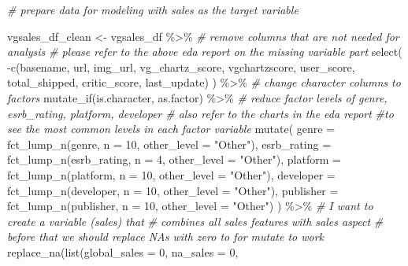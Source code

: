 \documentclass[
]{article}
\newenvironment{Shaded}{\begin{snugshade}}{\end{snugshade}}
\newcommand{\AttributeTok}[1]{\textcolor[rgb]{0.77,0.63,0.00}{#1}}
\newcommand{\CommentTok}[1]{\textcolor[rgb]{0.56,0.35,0.01}{\textit{#1}}}
\newcommand{\DecValTok}[1]{\textcolor[rgb]{0.00,0.00,0.81}{#1}}
\newcommand{\FunctionTok}[1]{\textcolor[rgb]{0.00,0.00,0.00}{#1}}
\newcommand{\NormalTok}[1]{#1}
\newcommand{\OtherTok}[1]{\textcolor[rgb]{0.56,0.35,0.01}{#1}}
\newcommand{\SpecialCharTok}[1]{\textcolor[rgb]{0.00,0.00,0.00}{#1}}
\newcommand{\StringTok}[1]{\textcolor[rgb]{0.31,0.60,0.02}{#1}}
\begin{document}
\begin{Shaded}
\begin{Highlighting}[]
\CommentTok{\# prepare data for modeling with sales as the target variable}


\NormalTok{vgsales\_df\_clean }\OtherTok{\textless{}{-}}\NormalTok{ vgsales\_df }\SpecialCharTok{\%\textgreater{}\%}
  \CommentTok{\# remove columns that are not needed for analysis }
  \CommentTok{\# please refer to the above eda report on the missing variable part}
  \FunctionTok{select}\NormalTok{(}
    \SpecialCharTok{{-}}\FunctionTok{c}\NormalTok{(basename, url, img\_url, vg\_chartz\_score, vgchartzscore, }
\NormalTok{       user\_score, total\_shipped, critic\_score, last\_update)}
\NormalTok{    ) }\SpecialCharTok{\%\textgreater{}\%} 
   \CommentTok{\# change character columns to factors}
  \FunctionTok{mutate\_if}\NormalTok{(is.character, as.factor) }\SpecialCharTok{\%\textgreater{}\%} 
  \CommentTok{\# reduce factor levels of genre, esrb\_rating, platform, developer}
  \CommentTok{\# also refer to the charts in the eda report }
  \CommentTok{\#to see the most common levels in each factor variable}
  \FunctionTok{mutate}\NormalTok{(}
    \AttributeTok{genre =} \FunctionTok{fct\_lump\_n}\NormalTok{(genre, }\AttributeTok{n =} \DecValTok{10}\NormalTok{, }\AttributeTok{other\_level =} \StringTok{"Other"}\NormalTok{),}
    \AttributeTok{esrb\_rating =} \FunctionTok{fct\_lump\_n}\NormalTok{(esrb\_rating, }\AttributeTok{n =} \DecValTok{4}\NormalTok{, }\AttributeTok{other\_level =} \StringTok{"Other"}\NormalTok{),}
    \AttributeTok{platform =} \FunctionTok{fct\_lump\_n}\NormalTok{(platform, }\AttributeTok{n =} \DecValTok{10}\NormalTok{, }\AttributeTok{other\_level =} \StringTok{"Other"}\NormalTok{),}
    \AttributeTok{developer =} \FunctionTok{fct\_lump\_n}\NormalTok{(developer, }\AttributeTok{n =} \DecValTok{10}\NormalTok{, }\AttributeTok{other\_level =} \StringTok{"Other"}\NormalTok{),}
    \AttributeTok{publisher =} \FunctionTok{fct\_lump\_n}\NormalTok{(publisher, }\AttributeTok{n =} \DecValTok{10}\NormalTok{, }\AttributeTok{other\_level =} \StringTok{"Other"}\NormalTok{)}
\NormalTok{    ) }\SpecialCharTok{\%\textgreater{}\%} 
  \CommentTok{\# I want to create a variable (sales) that }
  \CommentTok{\# combines all sales features with sales aspect}
  \CommentTok{\# before that we should replace NA\textquotesingle{}s with zero to for mutate to work}
  \FunctionTok{replace\_na}\NormalTok{(}\FunctionTok{list}\NormalTok{(}\AttributeTok{global\_sales =} \DecValTok{0}\NormalTok{,}
                  \AttributeTok{na\_sales =} \DecValTok{0}\NormalTok{,}

\end{Highlighting}
\end{Shaded}
\end{document}
